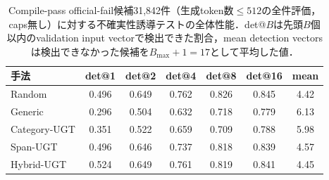 \begin{table}[t]
\caption{Compile-pass official-fail候補31,842件（生成token数$\le 512$の全件評価，caps無し）に対する不確実性誘導テストの全体性能．det@$B$は先頭$B$個以内のvalidation input vectorで検出できた割合，mean detection vectorsは検出できなかった候補を$B_{\max}+1=17$として平均した値．}
\label{tab:ugt_overall_full}
\centering
\footnotesize
\setlength{\tabcolsep}{4pt}
\begin{tabular}{@{}lcccccc@{}}
\hline
手法 & det@1 & det@2 & det@4 & det@8 & det@16 & mean \\
\hline
Random & 0.496 & 0.649 & 0.762 & 0.826 & 0.845 & 4.42 \\
Generic & 0.296 & 0.504 & 0.632 & 0.718 & 0.779 & 6.13 \\
Category-UGT & 0.351 & 0.522 & 0.659 & 0.709 & 0.788 & 5.98 \\
Span-UGT & 0.496 & 0.646 & 0.737 & 0.818 & 0.839 & 4.57 \\
Hybrid-UGT & 0.524 & 0.649 & 0.761 & 0.819 & 0.841 & 4.45 \\
\hline
\end{tabular}
\end{table}
